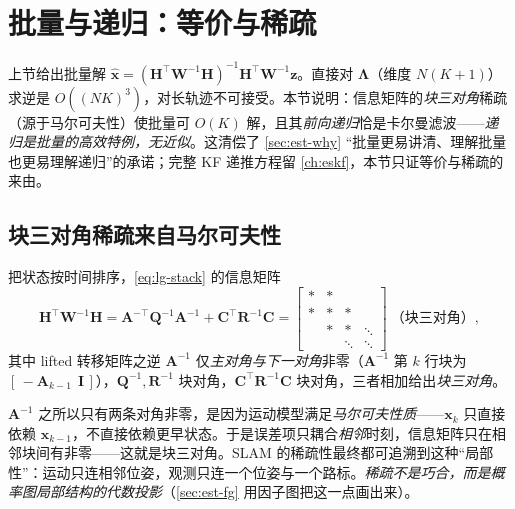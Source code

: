 \section{批量与递归：等价与稀疏}
\label{sec:est-batch-recursive}

上节给出批量解 $\hat{\mathbf{x}}=(\mathbf{H}^\top\mathbf{W}^{-1}\mathbf{H})^{-1}\mathbf{H}^\top\mathbf{W}^{-1}\mathbf{z}$。直接对 $\boldsymbol{\Lambda}$（维度 $N(K+1)$）求逆是 $O((NK)^3)$，对长轨迹不可接受。本节说明：信息矩阵的\emph{块三对角}稀疏（源于马尔可夫性）使批量可 $O(K)$ 解，且其\emph{前向递归}恰是卡尔曼滤波——\emph{递归是批量的高效特例，无近似}。这清偿了 \cref{sec:est-why} “批量更易讲清、理解批量也更易理解递归”的承诺；完整 KF 递推方程留 \cref{ch:eskf}，本节只证等价与稀疏的来由。

\subsection{块三对角稀疏来自马尔可夫性}
\label{sec:est-sparsity}

把状态按时间排序，\cref{eq:lg-stack} 的信息矩阵
\begin{equation}
  \mathbf{H}^\top\mathbf{W}^{-1}\mathbf{H}=\mathbf{A}^{-\top}\mathbf{Q}^{-1}\mathbf{A}^{-1}+\mathbf{C}^\top\mathbf{R}^{-1}\mathbf{C}
  =\begin{bmatrix}*&*&&\\ *&*&*&\\ &*&*&\ddots\\ &&\ddots&\ddots\end{bmatrix}\ \text{（块三对角）},
  \label{eq:tridiag}
\end{equation}
其中 lifted 转移矩阵之逆 $\mathbf{A}^{-1}$ 仅\emph{主对角与下一对角}非零（$\mathbf{A}^{-1}$ 第 $k$ 行块为 $[\,-\mathbf{A}_{k-1}\ \ \mathbf{I}\,]$），$\mathbf{Q}^{-1},\mathbf{R}^{-1}$ 块对角，$\mathbf{C}^\top\mathbf{R}^{-1}\mathbf{C}$ 块对角，三者相加给出\emph{块三对角}。

\begin{insight}
$\mathbf{A}^{-1}$ 之所以只有两条对角非零，是因为运动模型满足\emph{马尔可夫性质}——$\mathbf{x}_k$ 只直接依赖 $\mathbf{x}_{k-1}$，不直接依赖更早状态。于是误差项只耦合\emph{相邻}时刻，信息矩阵只在相邻块间有非零——这就是块三对角。SLAM 的稀疏性最终都可追溯到这种“局部性”：运动只连相邻位姿，观测只连一个位姿与一个路标。\emph{稀疏不是巧合，而是概率图局部结构的代数投影}（\cref{sec:est-fg} 用因子图把这一点画出来）。
\end{insight}

